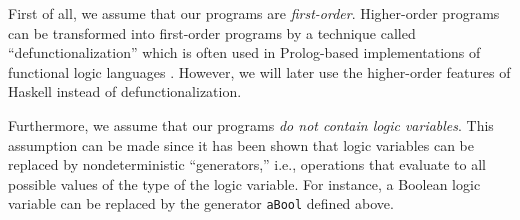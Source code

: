 \documentclass{llncs}
\newcommand{\code}[1]{\mbox{\small\texttt{#1}}}
\begin{document}
First of all, we assume that our programs are \emph{first-order}.
Higher-order programs can be transformed into first-order programs
by a technique called ``defunctionalization'' \cite{Reynolds72}
which is often used in Prolog-based implementations of
functional logic languages \cite{AntoyHanus00FROCOS}.
However, we will later use the higher-order features of Haskell
instead of defunctionalization.

\label{sec:no-logic-vars}
Furthermore, we assume that our programs \emph{do not contain logic variables}.
This assumption can be made since it has been shown
\cite{AntoyHanus06ICLP} that logic variables can be replaced
by nondeterministic ``generators,''
i.e., operations that evaluate to all possible values of the type of
the logic variable. For instance, a Boolean logic variable
can be replaced by the generator \code{aBool} defined above.
\end{document}
